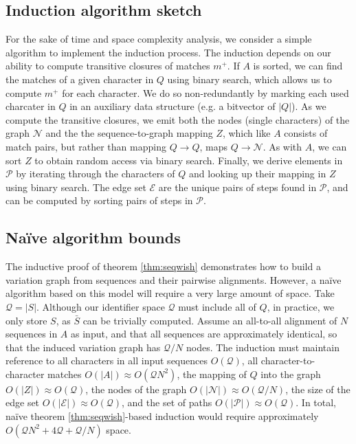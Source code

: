 \documentclass{bioinfo}
\theoremstyle{definition}
\begin{document}


\subsection{Induction algorithm sketch}

For the sake of time and space complexity analysis, we consider a simple algorithm to implement the induction process.
The induction depends on our ability to compute transitive closures of matches $m^+$.
If $A$ is sorted, we can find the matches of a given character in $Q$ using binary search, which allows us to compute $m^+$ for each character.
We do so non-redundantly by marking each used charcater in $Q$ in an auxiliary data structure (e.g. a bitvector of $|Q|$).
As we compute the transitive closures, we emit both the nodes (single characters) of the graph $\mathcal{N}$ and the the sequence-to-graph mapping $Z$, which like $A$ consists of match pairs, but rather than mapping $Q \to Q$, maps $Q \to \mathcal{N}$.
As with $A$, we can sort $Z$ to obtain random access via binary search.
Finally, we derive elements in $\mathcal{P}$ by iterating through the characters of $Q$ and looking up their mapping in $Z$ using binary search.
The edge set $\mathcal{E}$ are the unique pairs of steps found in $\mathcal{P}$, and can be computed by sorting pairs of steps in $\mathcal{P}$.


\subsection{Na\"{i}ve algorithm bounds}
\label{sec:bounds}

The inductive proof of theorem \ref{thm:seqwish} demonstrates how to build a variation graph from sequences and their pairwise alignments.
However, a na\"{i}ve algorithm based on this model will require a very large amount of space.
Take $\mathcal{Q} = |S|$.
Although our identifier space $\mathcal{Q}$ must include all of $Q$, in practice, we only store $S$, as $\bar{S}$ can be trivially computed.
Assume an all-to-all alignment of $N$ sequences in $A$ as input, and that all sequences are approximately identical, so that the induced variation graph has $\mathcal{Q}/N$ nodes.
The induction must maintain reference to all characters in all input sequences $O(\mathcal{Q})$, all character-to-character matches $O(|A|) \approx O(\mathcal{Q}N^2)$, the mapping of $Q$ into the graph $O(|Z|) \approx O(\mathcal{Q})$, the nodes of the graph $O(|\mathcal{N}|) \approx O(\mathcal{Q}/N)$, the size of the edge set $O(|\mathcal{E}|) \approx O(\mathcal{Q})$, and the set of paths $O(|\mathcal{P}|) \approx O(\mathcal{Q})$.
In total, na\"{i}ve theorem \ref{thm:seqwish}-based induction would require approximately $O(\mathcal{Q}N^2 + 4\mathcal{Q} + \mathcal{Q}/N)$ space.
\end{document}
